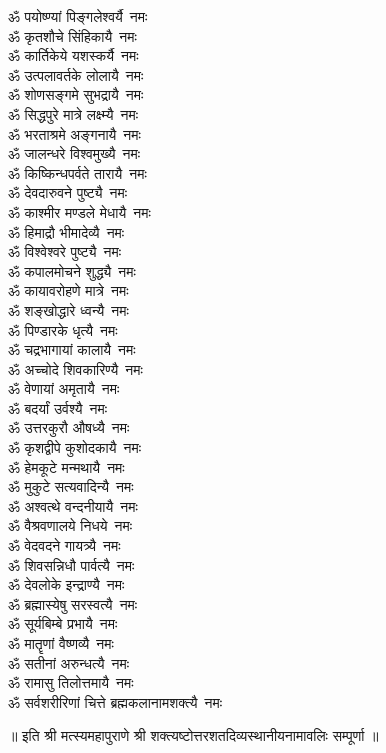 \begin{multicols}{2}
\begin{flushleft}
ॐ पयोष्ण्यां पिङ्गलेश्वर्यै~नमः\\
ॐ कृतशौचे सिंहिकायै~नमः\\
ॐ कार्तिकेये यशस्कर्यै~नमः\\
ॐ उत्पलावर्तके लोलायै~नमः\\
ॐ शोणसङ्गमे सुभद्रायै~नमः\\
ॐ सिद्धपुरे मात्रे लक्ष्म्यै~नमः\\
ॐ भरताश्रमे अङ्गनायै~नमः\\
ॐ जालन्धरे विश्वमुख्यै~नमः\hfill{}\\
ॐ किष्किन्धपर्वते तारायै~नमः\\
ॐ देवदारुवने पुष्ट्यै~नमः\\
ॐ काश्मीर मण्डले मेधायै~नमः\\
ॐ हिमाद्रौ भीमादेव्यै~नमः\\
ॐ विश्वेश्वरे पुष्ट्यै~नमः\\
ॐ कपालमोचने शुद्ध्यै~नमः\\
ॐ कायावरोहणे मात्रे~नमः\\
ॐ शङ्खोद्धारे ध्वन्यै~नमः\\
ॐ पिण्डारके धृत्यै~नमः\\
ॐ चद्रभागायां कालायै~नमः\hfill{}\\
ॐ अच्चोदे शिवकारिण्यै~नमः\\
ॐ वेणायां अमृतायै~नमः\\
ॐ बदर्यां उर्वश्यै~नमः\\
ॐ उत्तरकुरौ औषध्यै~नमः\\
ॐ कृशद्वीपे कुशोदकायै~नमः\\
ॐ हेमकूटे मन्मथायै~नमः\\
ॐ मुकुटे सत्यवादिन्यै~नमः\\
ॐ अश्वत्थे वन्दनीयायै~नमः\\
ॐ वैश्रवणालये निधये~नमः\\
ॐ वेदवदने गायत्र्यै~नमः\hfill{}\\
ॐ शिवसन्निधौ पार्वत्यै~नमः\\
ॐ देवलोके इन्द्राण्यै~नमः\\
ॐ ब्रह्मास्येषु सरस्वत्यै~नमः\\
ॐ सूर्यबिम्बे प्रभायै~नमः\\
ॐ मातॄणां वैष्णव्यै~नमः\\
ॐ सतीनां अरुन्धत्यै~नमः\\
ॐ रामासु तिलोत्तमायै~नमः\\
ॐ सर्वशरीरिणां चित्ते ब्रह्मकलानामशक्त्यै~नमः\\
\end{flushleft}
\end{multicols}
\centerline{॥ इति श्री मत्स्यमहापुराणे श्री शक्त्यष्टोत्तरशतदिव्यस्थानीयनामावलिः सम्पूर्णा ॥}
